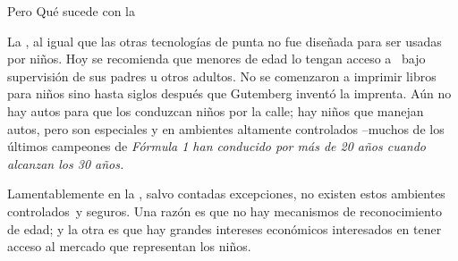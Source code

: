 % 
% 
% 

Pero \oqm Qu\'e sucede con la \internet\cqm 

La \internet, al igual que las otras tecnolog\'ias de punta no fue
dise\~nada para ser usadas por ni\~nos. Hoy se recomienda que menores de
edad lo tengan acceso a \internet\ bajo supervisi\'on de sus padres u otros adultos.
No se comenzaron a imprimir libros para ni\~nos sino hasta siglos
despu\'es que Gutemberg invent\'o la imprenta. A\'un no hay autos para que
los conduzcan ni\~nos por la calle; hay ni\~nos que manejan autos, pero son
especiales y en ambientes altamente controlados --muchos de los \'ultimos
campeones de \it{F\'ormula 1} han conducido por m\'as de 20 a\~nos cuando alcanzan los 30
a\~nos. 

Lamentablemente en la \web, salvo contadas excepciones, no existen 
estos \odq ambientes controlados\cdq\ y seguros. Una raz\'on es que no hay
mecanismos de reconocimiento de edad; y la otra es que hay
grandes intereses econ\'omicos interesados en tener acceso al mercado que
representan los ni\~nos.

